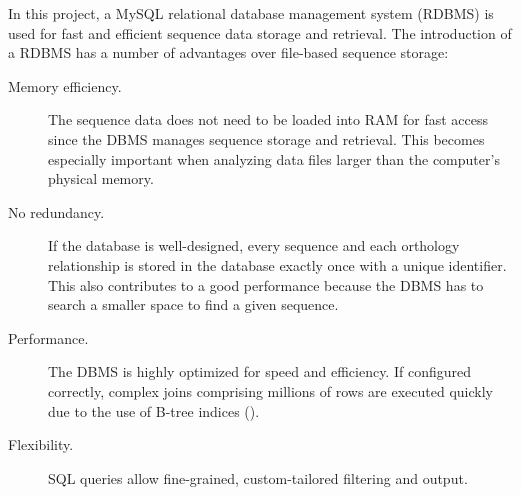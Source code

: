 In this project, a MySQL relational database management system (RDBMS) is used
for fast and efficient sequence data storage and retrieval. The introduction of
a RDBMS has a number of advantages over file-based sequence storage:

\begin{description}
	\item[Memory efficiency.] The sequence data does not need to be loaded into
		RAM for fast access since the DBMS manages sequence storage and retrieval.
		This becomes especially important when analyzing data files larger than the
		computer's physical memory.
	\item[No redundancy.] If the database is well-designed, every sequence and
		each orthology relationship is stored in the database exactly once with a
		unique identifier. This also contributes to a good performance because the
		DBMS has to search a smaller space to find a given sequence.
	\item[Performance.] The DBMS is highly optimized for speed and efficiency. If
		configured correctly, complex joins comprising millions of rows are executed
		quickly due to the use of B-tree indices (\cite{comer1979}).
	\item[Flexibility.] SQL queries allow fine-grained, custom-tailored filtering
		and output.
\end{description}

